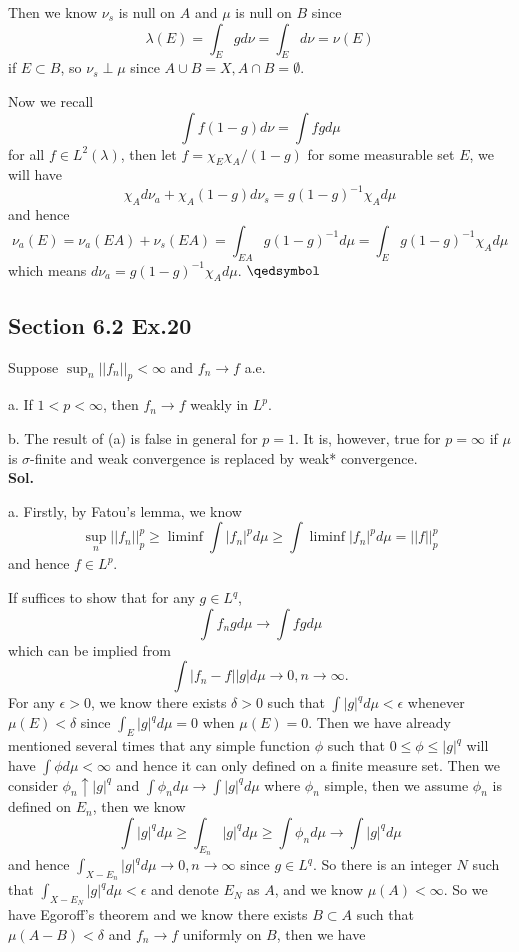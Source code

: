 \documentclass[lang=en,11pt,a4paper,citestyle =authoryear]{elegantpaper}
\newcommand{\prvd}{$\hfill \qedsymbol$}
\begin{document}
Then we know $\nu_s$ is null on $A$ and $\mu$ is null on $B$ since
\[\lambda(E) = \int_E g d\nu = \int_E d\nu = \nu(E)\]
if $E\subset B$, so $\nu_s \perp \mu$ since $A\cup B = X, A\cap B = \emptyset$.\par 
Now we recall
\[\int f(1-g)d\nu = \int fgd\mu\]
for all $f\in L^2(\lambda)$, then let $f = \chi_E\chi_A/(1-g)$ for some measurable set $E$, we will have
\[\chi_Ad\nu_a + \chi_A(1-g)d\nu_s= g(1-g)^{-1}\chi_A d\mu\]
and hence 
\[\nu_a(E) = \nu_a(EA) + \nu_s(EA) = \int_{EA} g(1-g)^{-1}d\mu = \int_E g(1-g)^{-1}\chi_Ad\mu\]
which means $d\nu_a = g(1-g)^{-1}\chi_A d\mu$.
\prvd
\vspace{0.5em}

\subsection*{Section 6.2 Ex.20} 
Suppose $\sup_n||f_n||_p < \infty$ and $f_n\to f$ a.e.\par
a. If $1<p<\infty$, then $f_n \to f$ weakly in $L^p$.\par
b. The result of (a) is false in general for $p=1$. It is, however, true for $p=\infty$ if $\mu$ is $\sigma$-finite
and weak convergence is replaced by weak* convergence.
\vspace{0.5em}\\
\textbf{Sol.} \par
a. Firstly, by Fatou's lemma, we know
\[\sup_n||f_n||_p^p \geq \liminf \int |f_n|^p d\mu \geq \int \liminf |f_n|^p d\mu = ||f||_p^p\]
and hence $f\in L^p$.\par
If suffices to show that for any $g\in L^q$,
\[\int f_ng d\mu \to \int fg d\mu\]
which can be implied from
\[\int |f_n-f||g|d\mu \to 0, n\to\infty.\]
For any $\epsilon > 0$, we know there exists $\delta > 0$ such that $\int |g|^q d\mu < \epsilon$ whenever $\mu(E)<\delta$ since $\int_E |g|^q d\mu = 0$ when $\mu(E)=0$. Then we have already mentioned several times that any simple function $\phi$ such that $0 \leq \phi \leq |g|^q$ will have $\int \phi d\mu<\infty$ and hence it can only defined on a finite measure set. Then we consider $\phi_n \uparrow |g|^q$ and $\int \phi_n d\mu \to \int |g|^q d\mu$ where $\phi_n$ simple, then we assume $\phi_n$ is defined on $E_n$, then we know
\[\int |g|^q d\mu \geq \int_{E_n} |g|^q d\mu\geq \int \phi_nd\mu \to \int |g|^q d\mu\]
and hence $\int_{X-E_n} |g|^q d\mu \to 0, n\to\infty$ since $g\in L^q$. So there is an integer $N$ such that $\int_{X-E_N}|g|^q d\mu < \epsilon$ and denote $E_N$ as $A$, and we know $\mu(A)<\infty$. So we have Egoroff's theorem and we know there exists $B\subset A$ such that $\mu(A-B)<\delta$ and $f_n\to f$ uniformly on $B$, then we have
\end{document}
